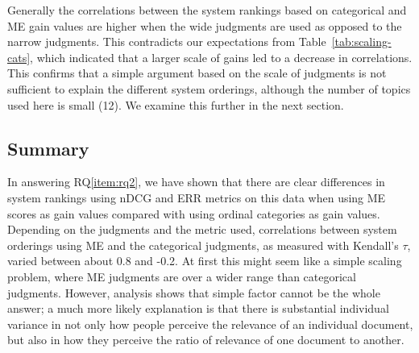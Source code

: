 Generally the correlations between the system rankings
based on categorical and ME gain values are higher when the wide
judgments are used as opposed to the narrow judgments.
This contradicts our expectations from Table~\ref{tab:scaling-cats},
which indicated that a larger scale of gains led to a decrease in
correlations.
This confirms that a simple argument based on the scale of judgments is
not sufficient to explain the different system orderings, although the
number of topics used here is small (12).
We examine this further in the next section.



\subsection{Summary}
\label{sec:summary-7}

In answering RQ\ref{item:rq2}, we have shown that
there are clear differences in system rankings using nDCG and ERR
metrics on this data when using ME scores as gain values compared with
using ordinal categories as gain values.
Depending on the judgments and the metric used, correlations between
system orderings using ME and the categorical judgments, as measured
with Kendall's $\tau$, varied between about 0.8 and -0.2. At first this
might seem like a simple scaling problem, where ME judgments are over
a wider range than categorical judgments.
However, analysis shows that simple factor cannot be the whole answer;
a much more likely explanation is that there is substantial individual
variance in not only how people perceive the relevance of an individual
document, but also in how they perceive the ratio of relevance of one
document to another.
 


